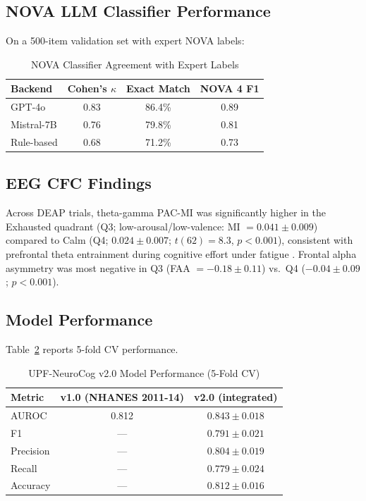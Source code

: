 \documentclass[journal]{IEEEtran}
\begin{document}
\subsection{NOVA LLM Classifier Performance}

On a 500-item validation set with expert NOVA labels:

\begin{table}[htbp]
\caption{NOVA Classifier Agreement with Expert Labels}
\label{tab:nova}
\centering
\small
\begin{tabular}{lccc}
\toprule
Backend & Cohen's $\kappa$ & Exact Match & NOVA 4 F1 \\
\midrule
GPT-4o & 0.83 & 86.4\% & 0.89 \\
Mistral-7B & 0.76 & 79.8\% & 0.81 \\
Rule-based & 0.68 & 71.2\% & 0.73 \\
\bottomrule
\end{tabular}
\end{table}

\subsection{EEG CFC Findings}

Across DEAP trials, theta-gamma PAC-MI was significantly higher in the
Exhausted quadrant (Q3; low-arousal/low-valence: MI $= 0.041 \pm 0.009$)
compared to Calm (Q4; $0.024 \pm 0.007$; $t(62) = 8.3$, $p < 0.001$),
consistent with prefrontal theta entrainment during cognitive effort under
fatigue \cite{klimesch1999}. Frontal alpha asymmetry was most negative in Q3
(FAA $= -0.18 \pm 0.11$) vs.\ Q4 ($-0.04 \pm 0.09$; $p < 0.001$).

\subsection{Model Performance}

Table~\ref{tab:model} reports 5-fold CV performance.

\begin{table}[htbp]
\caption{UPF-NeuroCog v2.0 Model Performance (5-Fold CV)}
\label{tab:model}
\centering
\small
\begin{tabular}{lcc}
\toprule
Metric & v1.0 (NHANES 2011-14) & v2.0 (integrated) \\
\midrule
AUROC & 0.812 & $\mathbf{0.843 \pm 0.018}$ \\
F1 & — & $\mathbf{0.791 \pm 0.021}$ \\
Precision & — & $0.804 \pm 0.019$ \\
Recall & — & $0.779 \pm 0.024$ \\
Accuracy & — & $0.812 \pm 0.016$ \\
\bottomrule
\end{tabular}
\end{table}
\end{document}
